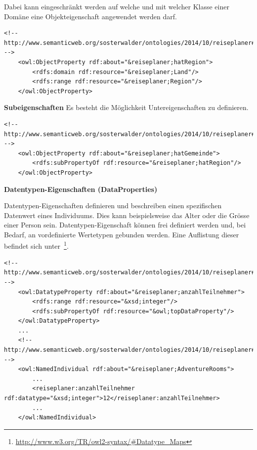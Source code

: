Dabei kann eingeschränkt werden auf welche und mit welcher Klasse einer Domäne eine Objekteigenschaft angewendet werden darf.

\begin{lstlisting}[caption={Beispiel von Einschränkungen der Objekteigenschaft \textit{hatRegion}}]
    <!-- http://www.semanticweb.org/sosterwalder/ontologies/2014/10/reiseplaner#hatRegion -->
    <owl:ObjectProperty rdf:about="&reiseplaner;hatRegion">
        <rdfs:domain rdf:resource="&reiseplaner;Land"/>
        <rdfs:range rdf:resource="&reiseplaner;Region"/>
    </owl:ObjectProperty>
\end{lstlisting}

\textbf{Subeigenschaften}
Es besteht die Möglichkeit Untereigenschaften zu definieren.

\begin{lstlisting}[caption={Beispiel der Objekteigenschaft \textit{hatGemeinde} als Subeigenschaft von \textit{hatRegion}}]
    <!-- http://www.semanticweb.org/sosterwalder/ontologies/2014/10/reiseplaner#hatGemeinde -->
    <owl:ObjectProperty rdf:about="&reiseplaner;hatGemeinde">
        <rdfs:subPropertyOf rdf:resource="&reiseplaner;hatRegion"/>
    </owl:ObjectProperty>
\end{lstlisting}

\textbf{Datentypen-Eigenschaften (DataProperties)}

Datentypen-Eigenschaften definieren und beschreiben einen spezifischen Datenwert eines Individuums. Dies kann beispielsweise das Alter oder die Grösse einer Person sein. Datentypen-Eigenschaft können frei definiert werden und, bei Bedarf, an vordefinierte Wertetypen gebunden werden. Eine Auflistung dieser befindet sich unter~\footnote{\url{http://www.w3.org/TR/owl2-syntax/\#Datatype_Maps}}.


\begin{lstlisting}[caption={Beispiel der Datentypen-Eigenschaft \textit{anzahlTeilnehmer} und deren Anwendung bei einem Individuum}]
    <!-- http://www.semanticweb.org/sosterwalder/ontologies/2014/10/reiseplaner#anzahlTeilnehmer -->
    <owl:DatatypeProperty rdf:about="&reiseplaner;anzahlTeilnehmer">
        <rdfs:range rdf:resource="&xsd;integer"/>
        <rdfs:subPropertyOf rdf:resource="&owl;topDataProperty"/>
    </owl:DatatypeProperty>
    ...
    <!-- http://www.semanticweb.org/sosterwalder/ontologies/2014/10/reiseplaner#AdventureRooms -->
    <owl:NamedIndividual rdf:about="&reiseplaner;AdventureRooms">
        ...
        <reiseplaner:anzahlTeilnehmer rdf:datatype="&xsd;integer">12</reiseplaner:anzahlTeilnehmer>
        ...
    </owl:NamedIndividual>
\end{lstlisting}

